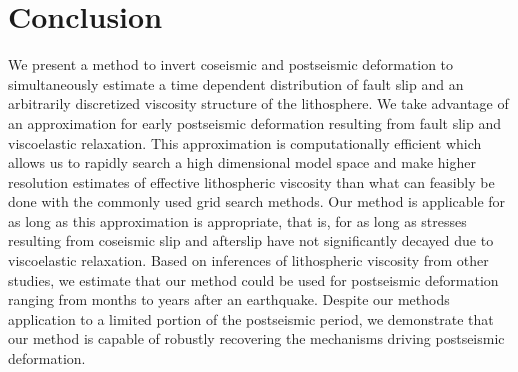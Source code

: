 \section{Conclusion}
We present a method to invert coseismic and postseismic deformation to
simultaneously estimate a time dependent distribution of fault slip
and an arbitrarily discretized viscosity structure of the lithosphere.
We take advantage of an approximation for early postseismic
deformation resulting from fault slip and viscoelastic relaxation.
This approximation is computationally efficient which allows us to
rapidly search a high dimensional model space and make higher
resolution estimates of effective lithospheric viscosity than what can
feasibly be done with the commonly used grid search methods. Our
method is applicable for as long as this approximation is appropriate,
that is, for as long as stresses resulting from coseismic slip and
afterslip have not significantly decayed due to viscoelastic
relaxation.  Based on inferences of lithospheric viscosity from other
studies, we estimate that our method could be used for postseismic
deformation ranging from months to years after an earthquake.
Despite our methods application to a limited portion of the
postseismic period, we demonstrate that our method is capable of
robustly recovering the mechanisms driving postseismic deformation.





